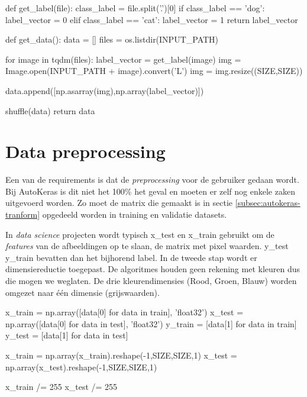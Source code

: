 \bigskip

\begin{python}
def get_label(file):
    class_label = file.split('.')[0]
    if class_label == 'dog': label_vector = 0
    elif class_label == 'cat': label_vector = 1
    return label_vector
    
def get_data():
    data = []
    files = os.listdir(INPUT_PATH)
    
    for image in tqdm(files):
        label_vector = get_label(image)
        img = Image.open(INPUT_PATH + image).convert('L')
        img = img.resize((SIZE,SIZE))
    
        data.append([np.asarray(img),np.array(label_vector)])
        
    shuffle(data)
    return data

\end{python}

\section{Data preprocessing}
\label{sec:preprocessing-autokeras}

Een van de requirements is dat de \textit{preprocessing} voor de gebruiker gedaan wordt. Bij AutoKeras is dit niet het 100\% het geval en moeten er zelf nog enkele zaken uitgevoerd worden. Zo moet de matrix die gemaakt is in sectie \ref{subsec:autokeras-tranform} opgedeeld worden in training en validatie datasets.

In \textit{data science} projecten wordt typisch x\_test en x\_train gebruikt om de \textit{features} van de afbeeldingen op te slaan, de matrix met pixel waarden. y\_test y\_train bevatten dan het bijhorend label. In de tweede stap wordt er dimensiereductie toegepast. De algoritmes houden geen rekening met kleuren dus die mogen we weglaten. De drie kleurendimensies (Rood, Groen, Blauw) worden omgezet naar één dimensie (grijswaarden).

\bigskip

\begin{python}
x_train = np.array([data[0] for data in train], 'float32')
x_test = np.array([data[0] for data in test], 'float32')
y_train = [data[1] for data in train]
y_test = [data[1] for data in test]

x_train = np.array(x_train).reshape(-1,SIZE,SIZE,1)
x_test = np.array(x_test).reshape(-1,SIZE,SIZE,1)

x_train /= 255
x_test /= 255
\end{python}

